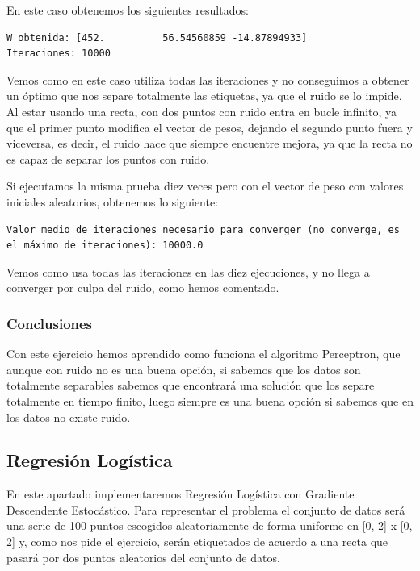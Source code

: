 \documentclass[12pt, spanish]{article}
\begin{document}
En este caso obtenemos los siguientes resultados:

\begin{lstlisting}
W obtenida: [452.          56.54560859 -14.87894933]
Iteraciones: 10000
\end{lstlisting}

Vemos como en este caso utiliza todas las iteraciones y no conseguimos a obtener un óptimo que nos separe totalmente las etiquetas, ya que el ruido se lo impide. Al estar usando una recta, con dos puntos con ruido entra en bucle infinito, ya que el primer punto modifica el vector de pesos, dejando el segundo punto fuera y viceversa, es decir, el ruido hace que siempre encuentre mejora, ya que la recta no es capaz de separar los puntos con ruido.


Si ejecutamos la misma prueba diez veces pero con el vector de peso con valores iniciales aleatorios, obtenemos lo siguiente:

\begin{lstlisting}
Valor medio de iteraciones necesario para converger (no converge, es el máximo de iteraciones): 10000.0
\end{lstlisting}

Vemos como usa todas las iteraciones en las diez ejecuciones, y no llega a converger por culpa del ruido, como hemos comentado.


\subsubsection{Conclusiones}

Con este ejercicio hemos aprendido como funciona el algoritmo Perceptron, que aunque con ruido no es una buena opción, si sabemos que los datos son totalmente separables sabemos que encontrará una solución que los separe totalmente en tiempo finito, luego siempre es una buena opción si sabemos que en los datos no existe ruido.


\newpage

\subsection{Regresión Logística}

En este apartado implementaremos Regresión Logística con Gradiente Descendente Estocástico. Para representar el problema el conjunto de datos será una serie de 100 puntos escogidos aleatoriamente de forma uniforme en [0, 2] x [0, 2] y, como nos pide el ejercicio, serán etiquetados de acuerdo a una recta que pasará por dos puntos aleatorios del conjunto de datos.
\end{document}
